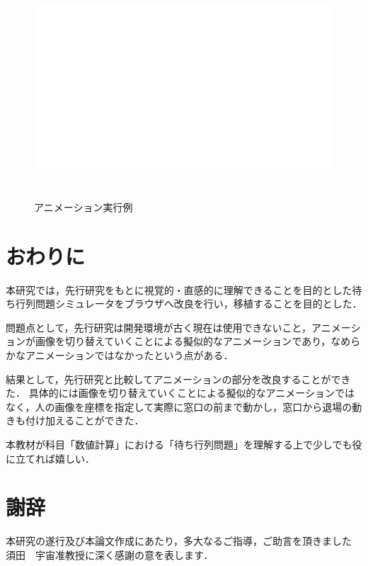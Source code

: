 \documentclass[12pt,a4j]{ltjsarticle}
\begin{document}
\begin{figure}[h]
\begin{center}
\includegraphics[height = 80mm ] {figures/figure_sample.pdf}
\caption{アニメーション実行例}
\label{fig:アニメ実行}
\end{center}
\end{figure}

\clearpage


\section{おわりに}
本研究では，先行研究をもとに視覚的・直感的に理解できることを目的とした待ち行列問題シミュレータをブラウザへ改良を行い，移植することを目的とした．

問題点として，先行研究は開発環境が古く現在は使用できないこと，アニメーションが画像を切り替えていくことによる擬似的なアニメーションであり，なめらかなアニメーションではなかったという点がある．

結果として，先行研究と比較してアニメーションの部分を改良することができた．
具体的には画像を切り替えていくことによる擬似的なアニメーションではなく，人の画像を座標を指定して実際に窓口の前まで動かし，窓口から退場の動きも付け加えることができた．

本教材が科目「数値計算」における「待ち行列問題」を理解する上で少しでも役に立てれば嬉しい．

\clearpage

\section{謝辞}
本研究の遂行及び本論文作成にあたり，多大なるご指導，ご助言を頂きました  須田　宇宙准教授に深く感謝の意を表します．
\clearpage
\end{document}
